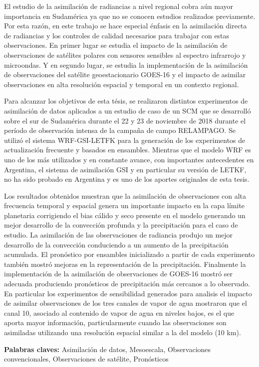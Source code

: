 \documentclass[12pt,oneside]{reedthesis}
\begin{document}
\begin{resumen}
    El estudio de la asimilación de radiancias a nivel regional cobra aún mayor importancia en Sudamérica ya que no se conocen estudios realizados previamente. Por esta razón, en este trabajo se hace especial énfasis en la asimilación directa de radiancias y los controles de calidad necesarios para trabajar con estas observaciones. En primer lugar se estudia el impacto de la asimilación de observaciones de satélites polares con sensores sensibles al espectro infrarrojo y microondas. Y en segundo lugar, se estudia la implementación de la asimilación de observaciones del satélite geoestacionario GOES-16 y el impacto de asimilar observaciones en alta resolución espacial y temporal en un contexto regional.
    
    Para alcanzar los objetivos de esta tésis, se realizaron distintos experimentos de asimilación de datos aplicados a un estudio de caso de un SCM que se desarrolló sobre el sur de Sudamérica durante el 22 y 23 de noviembre de 2018 durante el período de observación intensa de la campaña de campo RELAMPAGO. Se utilizó el sistema WRF-GSI-LETFK para la generación de los experimentos de actualización frecuente y basados en ensambles. Mientras que el modelo WRF es uno de los más utilizados y en constante avance, con importantes antecedentes en Argentina, el sistema de asimilación GSI y en particular su versión de LETKF, no ha sido probado en Argentina y es uno de los aportes originales de esta tesis.
    
    Los resultados obtenidos muestran que la asimilación de observaciones con alta frecuencia temporal y espacial genera un importante impacto en la capa límite planetaria corrigiendo el bias cálido y seco presente en el modelo generando un mejor desarrollo de la convección profunda y la precipitación para el caso de estudio. La asimilación de las observaciones de radiancia produjo un mejor desarrollo de la convección conduciendo a un aumento de la precipitación acumulada. El pronóstico por ensambles inicializado a partir de cada experimento también mostró mejoras en la representación de la precipitación. Finalmente la implementación de la asimilación de observaciones de GOES-16 mostró ser adecuada produciendo pronósticos de precipitación más cercanos a lo observado. En particular los experimentos de sensibilidad generados para analisis el impacto de asimilar observaciones de los tres canales de vapor de agua mostraron que el canal 10, asociado al contenido de vapor de agua en niveles bajos, es el que aporta mayor información, particularmente cuando las observaciones son asimiladas utilizando una resolución espacial similar a la del modelo (10 km).
    
    \textbf{Palabras claves:} Asimilación de datos, Mesoescala, Observaciones convencionales, Observaciones de satélite, Pronósticos
  \end{resumen}
\end{document}
